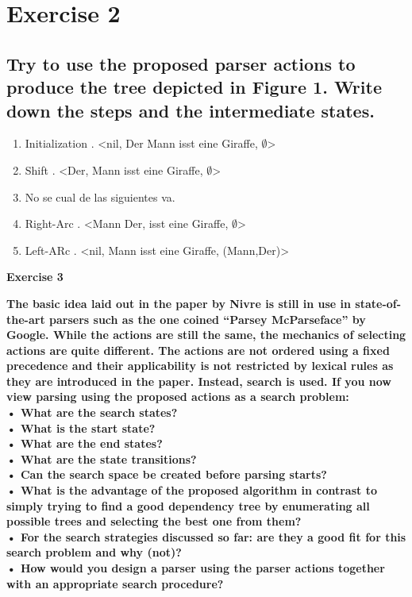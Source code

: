 \documentclass[paper=a4, fontsize=11pt]{scrartcl} %
\numberwithin{equation}{section} %
\numberwithin{figure}{section} %
\numberwithin{table}{section} %
\begin{document}
\section*{Exercise 2}


\subsection*{Try to use the proposed parser actions to produce the tree depicted in Figure 1. Write down the steps and the intermediate states.}

\begin{enumerate}
	\item Initialization . <nil, Der Mann isst eine Giraffe, $\emptyset$>
	\item Shift . <Der, Mann isst eine Giraffe, $\emptyset$>
	\item No se cual de las siguientes va.
	\item Right-Arc . <Mann Der, isst eine Giraffe, $\emptyset$>
	\item Left-ARc . <nil, Mann isst eine Giraffe, {(Mann,Der)}>
	
\end{enumerate}





\huge{ \textbf{Exercise 3}}
\newline

\large{\textbf{The basic idea laid out in the paper by Nivre is still in use in state-of-the-art parsers such as the one coined “Parsey McParseface” by Google. While the actions are still the same, the mechanics of selecting actions are quite different. The actions are not ordered using a fixed precedence and their applicability is not restricted by lexical rules as they are introduced in the paper. Instead, search is used.
If you now view parsing using the proposed actions as a search problem:\\
\newline
• What are the search states?\\
• What is the start state?\\
• What are the end states?\\
• What are the state transitions?\\
• Can the search space be created before parsing starts?\\
• What is the advantage of the proposed algorithm in contrast to simply trying to find a good dependency tree by enumerating all possible trees and selecting the best one from them?\\
• For the search strategies discussed so far: are they a good fit for this search problem and why (not)?\\
• How would you design a parser using the parser actions together with an appropriate search procedure?}}\\



\newpage

\end{document}
